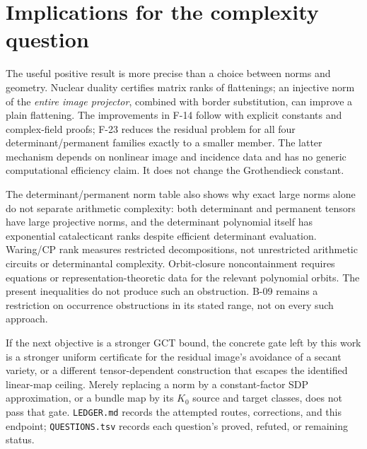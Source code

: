 \documentclass[11pt]{article}
\begin{document}
\section{Implications for the complexity question}
The useful positive result is more precise than a choice
between norms and geometry. Nuclear duality certifies
matrix ranks of flattenings; an injective norm of the
\emph{entire image projector}, combined with border
substitution, can improve a plain flattening. The improvements
in F-14 follow with explicit constants and complex-field
proofs; F-23 reduces the residual problem for all four
determinant/permanent families exactly to a smaller member.
The latter mechanism depends on nonlinear image and
incidence data and has no generic computational efficiency
claim. It does not change the Grothendieck constant.

The determinant/permanent norm table also shows why exact
large norms alone do not separate arithmetic complexity:
both determinant and permanent tensors have large projective
norms, and the determinant polynomial itself has exponential
catalecticant ranks despite efficient determinant evaluation.
Waring/CP rank measures restricted decompositions, not
unrestricted arithmetic circuits or determinantal complexity.
Orbit-closure noncontainment requires equations or
representation-theoretic data for the relevant polynomial
orbits. The present inequalities do not produce such an
obstruction. B-09 remains a restriction on occurrence
obstructions in its stated range, not on every such approach.

If the next objective is a stronger GCT bound, the concrete
gate left by this work is a stronger uniform certificate for
the residual image's avoidance of a secant variety, or a
different tensor-dependent construction that escapes the
identified linear-map ceiling. Merely replacing a norm by a
constant-factor SDP approximation, or a bundle map by its
$K_0$ source and target classes, does not pass that gate.
\texttt{LEDGER.md} records the attempted routes, corrections,
and this endpoint; \texttt{QUESTIONS.tsv} records each
question's proved, refuted, or remaining status.
\end{document}
